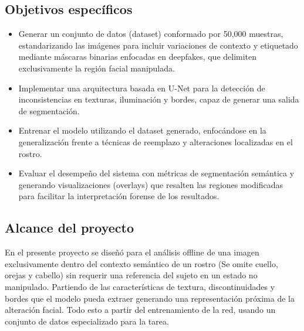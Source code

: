 \subsection{Objetivos específicos}

\begin{itemize}
    \item Generar un conjunto de datos (dataset) conformado por 50,000 muestras, estandarizando las imágenes para incluir variaciones de contexto y etiquetado mediante máscaras binarias enfocadas en deepfakes, que delimiten exclusivamente la región facial manipulada.
    \item Implementar una arquitectura basada en U-Net para la detección de inconsistencias en texturas, iluminación y bordes, capaz de generar una salida de segmentación.
    \item Entrenar el modelo utilizando el dataset generado, enfocándose en la generalización frente a técnicas de reemplazo y alteraciones localizadas en el rostro.
    \item Evaluar el desempeño del sistema con métricas de segmentación semántica y generando visualizaciones (overlays) que resalten las regiones modificadas para facilitar la interpretación forense de los resultados.
\end{itemize}

\subsection{Alcance del proyecto}
En el presente proyecto se diseñó para el análisis offline de una imagen exclusivamente dentro del contexto semántico de un rostro (Se omite cuello, orejas y cabello) sin requerir una referencia del sujeto en un estado no manipulado. Partiendo de las características de textura, discontinuidades y bordes que el modelo pueda extraer generando una representación próxima de la alteración facial. Todo esto a partir del entrenamiento de la red, usando un conjunto de datos especializado para la tarea.
